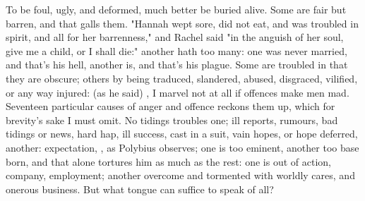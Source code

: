 
To be foul, ugly, and deformed, much better be buried alive. Some are fair but
barren, and that galls them. "Hannah wept sore, did not eat, and was troubled
in spirit, and all for her barrenness,"  and  Rachel said "in the anguish of her soul, give me a child, or I shall die:"
another hath too many: one was never married, and that's his hell, another is,
and that's his plague. Some are troubled in that they are obscure; others by
being traduced, slandered, abused, disgraced, vilified, or any way injured:
 (as he said) , I
marvel not at all if offences make men mad. Seventeen particular causes of
anger and offence \Aristotle{} reckons them up, which for brevity's sake I must
omit. No tidings troubles one; ill reports, rumours, bad tidings or news, hard
hap, ill success, cast in a suit, vain hopes, or hope deferred, another:
expectation, , as
Polybius observes; one is too eminent, another too base
born, and that alone tortures him as much as the rest: one is out of action,
company, employment; another overcome and tormented with worldly cares, and
onerous business. But what tongue can suffice to speak of
all?

